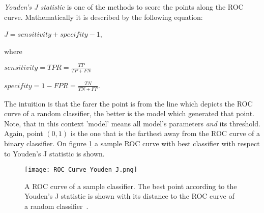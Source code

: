 \documentclass[a4paper,10pt]{report}
\begin{document}
\begin{appendices}
      \emph{Youden's J statistic} is one of the methods to score the points along the ROC curve. Mathematically it is described by the following equation:
      
      \begin{center}
      $J = sensitivity + specifity - 1$,
      \end{center}

      
      where
      \begin{center}
      $sensitivity = TPR = \frac{TP}{TP + FN}$
       
      $specifity = 1 - FPR = \frac{TN}{TN + FP}$.
      \end{center}
      
      The intuition is that the farer the point is from the line which depicts the ROC curve of a random classifier, the better is the model which generated that point. Note, that in this context 'model' means all model's parameters \emph{and} its threshold. Again, point $(0,1)$ is the one that is the farthest away from the ROC curve of a binary classifier. On figure \ref{fig:YOUDEN} a sample ROC curve with best classifier with respect to Youden's J statistic is shown.
      
      \begin{figure}[h!]
	  \centering
	  \texttt{[image: ROC\_Curve\_Youden\_J.png]}
	  \caption{A ROC curve of a sample classifier. The best point according to the Youden's J statistic is shown with its distance to the ROC curve of a random classifier~\cite{bibYOUDEN}.}
	  \label{fig:YOUDEN}
      \end{figure} 
      
      
      
  \end{appendices}
      
\end{document}
